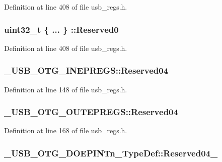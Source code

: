 Definition at line 408 of file usb\-\_\-regs.\-h.

\hypertarget{group___u_s_b___o_t_g___d_r_i_v_e_r_ga6fde17d02c1c6536930760092c229b95}{
\subsubsection[{Reserved0}]{\setlength{\rightskip}{0pt plus 5cm}uint32\-\_\-t \{ ... \} \-::Reserved0}}\label{group___u_s_b___o_t_g___d_r_i_v_e_r_ga6fde17d02c1c6536930760092c229b95}


Definition at line 408 of file usb\-\_\-regs.\-h.

\hypertarget{group___u_s_b___o_t_g___d_r_i_v_e_r_ga279df0532f0eacc582a40057e66be6f6}{
\subsubsection[{Reserved04}]{ \-\_\-\-U\-S\-B\-\_\-\-O\-T\-G\-\_\-\-I\-N\-E\-P\-R\-E\-G\-S\-::\-Reserved04}}\label{group___u_s_b___o_t_g___d_r_i_v_e_r_ga279df0532f0eacc582a40057e66be6f6}


Definition at line 148 of file usb\-\_\-regs.\-h.

\hypertarget{group___u_s_b___o_t_g___d_r_i_v_e_r_gafa7d72460d6ddee492c7ad38713ebec5}{
\subsubsection[{Reserved04}]{ \-\_\-\-U\-S\-B\-\_\-\-O\-T\-G\-\_\-\-O\-U\-T\-E\-P\-R\-E\-G\-S\-::\-Reserved04}}\label{group___u_s_b___o_t_g___d_r_i_v_e_r_gafa7d72460d6ddee492c7ad38713ebec5}


Definition at line 168 of file usb\-\_\-regs.\-h.

\hypertarget{group___u_s_b___o_t_g___d_r_i_v_e_r_gaf42d3169ce0fb063fbccbbc7ad0efd57}{
\subsubsection[{Reserved04\-\_\-31}]{ \-\_\-\-U\-S\-B\-\_\-\-O\-T\-G\-\_\-\-D\-O\-E\-P\-I\-N\-Tn\-\_\-\-Type\-Def\-::\-Reserved04\-\_}}\label{group___u_s_b___o_t_g___d_r_i_v_e_r_gaf42d3169ce0fb063fbccbbc7ad0efd57}


